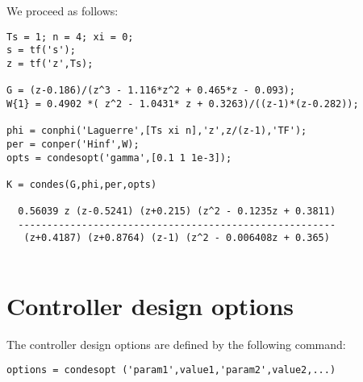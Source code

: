 \documentclass [12pt , a4paper] {report}
\begin{document}
We proceed as follows:
\begin{lstlisting}
Ts = 1; n = 4; xi = 0;
s = tf('s');
z = tf('z',Ts);

G = (z-0.186)/(z^3 - 1.116*z^2 + 0.465*z - 0.093);
W{1} = 0.4902 *( z^2 - 1.0431* z + 0.3263)/((z-1)*(z-0.282));

phi = conphi('Laguerre',[Ts xi n],'z',z/(z-1),'TF');
per = conper('Hinf',W);
opts = condesopt('gamma',[0.1 1 1e-3]);

K = condes(G,phi,per,opts)

  0.56039 z (z-0.5241) (z+0.215) (z^2 - 0.1235z + 0.3811)
  -------------------------------------------------------
   (z+0.4187) (z+0.8764) (z-1) (z^2 - 0.006408z + 0.365)
 
\end{lstlisting}


\section{Controller design options}

The controller design options are defined by the following command:
\begin{lstlisting}
options = condesopt ('param1',value1,'param2',value2,...)
\end{lstlisting}

\end{document}
